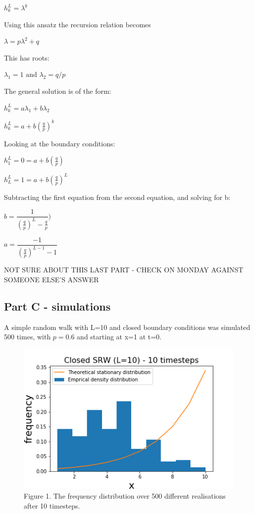 \documentclass{article}
\begin{document}
$h_{k}^L = \lambda^k $

Using this ansatz the recursion relation becomes

$\lambda = p \lambda^2 + q$

This has roots:

$\lambda_1 = 1 \text{ and } \lambda_2 = q/p$



The general solution is of the form:

$h_k^L = a\lambda_1 + b\lambda_2$ 

$h_k^L = a + b(\frac{q}{p})^k$ 


Looking at the boundary conditions:

$h_1^L = 0 = a + b(\frac{q}{p})$

$h_L^L = 1 = a + b(\frac{q}{p})^L$

Subtracting the first equation from the second equation, and solving for b:

$b = \dfrac{1}{(\frac{q}{p})^{L}-\frac{q}{p}})$

$a = \dfrac{-1}{(\frac{q}{p})^{L-1}-1}$

NOT SURE ABOUT THIS LAST PART - CHECK ON MONDAY AGAINST SOMEONE ELSE'S ANSWER

\subsection{Part C - simulations}

A simple random walk with L=10 and closed boundary conditions was simulated 500 times, with $p=0.6$ and starting at x=1 at t=0.

\begin{figure}[H]
\includegraphics[scale=0.8]{10_steps_a.png} 
\small{Figure 1. The frequency distribution over 500 different realisations after 10 timesteps.}
\end{figure}
\end{document}
